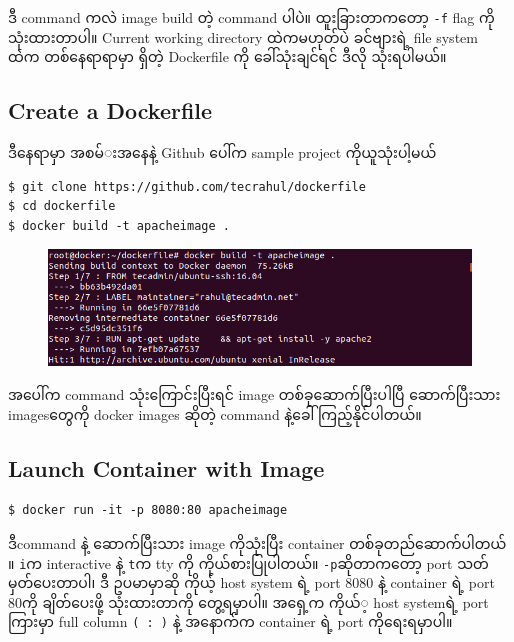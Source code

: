 ဒီ command ကလဲ image build တဲ့ command ပါပဲ။ ထူးခြားတာက​တော့ \texttt{-f}
flag ကိုသုံးထားတာပါ။ Current working directory ထဲကမဟုတ်​ပဲ ခင်​​ဗျားရဲ့
file system ထဲက တစ်​​နေရာရာမှာ ရှိတဲ့ Dockerfile ကို ​ခေါ်သုံးချင်​ရင်​
ဒီလို သုံးရပါမယ်​။

\subsection{Create a Dockerfile}\label{create-a-dockerfile}

ဒီ​နေရာမှာ အစမ်​း​အ​နေနဲ့ Github ​ပေါ်က sample project ကိုယူသုံးပါ့မယ်​

\begin{verbatim}
$ git clone https://github.com/tecrahul/dockerfile 
$ cd dockerfile
$ docker build -t apacheimage .
\end{verbatim}

\begin{figure}[htbp]
\centering
\includegraphics{.gitbook/assets/3c_apacheimage_build.png}
\end{figure}

အ​ပေါ်က command သုံး​ကြောင်းပြီးရင်​ image တစ်​ခု​ဆောက်​ပြီးပါပြီ
​ဆောက်​ပြီးသား images ​တွေကို docker images ဆိုတဲ့ command
နဲ့​ခေါ်ကြည့်နိုင်​ပါတယ်​။

\subsection{Launch Container with
Image}\label{launch-container-with-image}

\begin{verbatim}
$ docker run -it -p 8080:80 apacheimage
\end{verbatim}

ဒီcommand နဲ့ ​ဆောက်​ပြီးသား image ကိုသုံးပြီး container
တစ်​ခုတည်​​ဆောက်​ပါတယ်​။ \texttt{i}က interactive နဲ့ \texttt{t}က tty ကို
ကိုယ်​စားပြုပါတယ်​။ \texttt{-p}ဆိုတာက​တော့ port သတ်​မှတ်​​ပေးတာပါ၊ ဒီ
ဥပမာမှာဆို ကိုယ့် host system ရဲ့ port 8080 နဲ့ container ရဲ့ port 80ကို
ချိတ်​​ပေးဖို့ သုံးထားတာကို ​တွေ့ရမှာပါ။ အ​ရှေ့က ကိုယ်​့ host systemရဲ့
port ကြားမှာ full column \texttt{( : )} နဲ့ အ​နောက်​က container ရဲ့ port
ကို​ရေးရမှာပါ။

